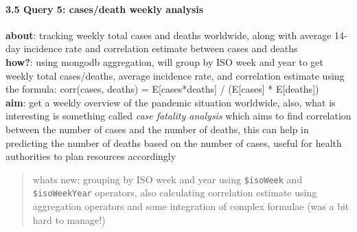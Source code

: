 \documentclass[
]{article}
\begin{document}
\hypertarget{query-5-casesdeath-weekly-analysis}{%
\paragraph{3.5 Query 5: cases/death weekly
analysis}\label{query-5-casesdeath-weekly-analysis}}

\textbf{about}: tracking weekly total cases and deaths worldwide, along
with average 14-day incidence rate and correlation estimate between
cases and deaths\\
\textbf{how?}: using mongodb aggregation, will group by ISO week and
year to get weekly total cases/deaths, average incidence rate, and
correlation estimate using the formula: corr(cases, deaths) =
E{[}cases*deaths{]} / (E{[}cases{]} * E{[}deaths{]})\\
\textbf{aim}: get a weekly overview of the pandemic situation worldwide,
also, what is interesting is something called \emph{case fatality
analysis} which aims to find correlation between the number of cases and
the number of deaths, this can help in predicting the number of deaths
based on the number of cases, useful for health authorities to plan
resources accordingly

\begin{quote}
whats new: grouping by ISO week and year using \texttt{\$isoWeek} and
\texttt{\$isoWeekYear} operators, also calculating correlation estimate
using aggregation operators and some integration of complex formulae
(was a bit hard to manage!)
\end{quote}
\end{document}
